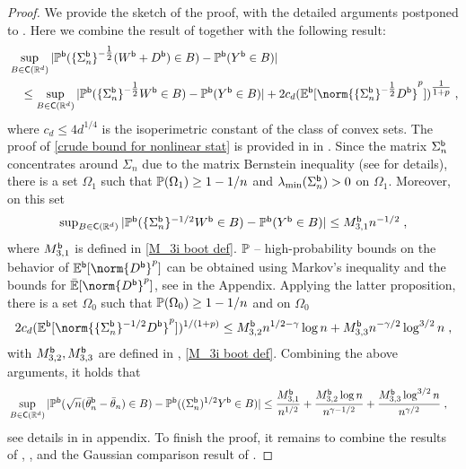\begin{proof} We provide the sketch of the proof, with the detailed arguments postponed to . Here we combine the result of  together with the following result: 
\begin{equation}
\label{crude bound for nonlinear stat}
\begin{split}
&\sup_{B \in \Conv(\rset^d)}|\PPb(\{\Sigma_n^\boot\}^{-\tfrac{1}{2}} (W^\boot + D^\boot) \in B) - \PPb(Y^\boot \in B)|  \\ 
&\quad \leq \sup_{B \in \Conv(\rset^d)}|\PPb(\{\Sigma_n^\boot\}^{-\tfrac{1}{2}} W^\boot \in B) - \PPb(Y^\boot \in B)| +  2 c_d (\PEb[\norm{\{\Sigma_n^\boot\}^{-\tfrac{1}{2}} D^\boot}^p])^{\tfrac{1}{1+p}}\eqsp, 
\end{split}
\end{equation}
where $c_d \le 4 d^{1/4}$ is the isoperimetric constant of the class of convex sets. The proof of \eqref{crude bound for nonlinear stat} is provided in  in . Since the matrix $\Sigma_n^{\mathsf{b}}$ concentrates around $\Sigma_n$ due to the matrix Bernstein inequality (see  for details), there is a set $\Omega_1$ such that $\mathbb{P}(\Omega_1) \geq 1-1/n$ and $\lambda_{\min}(\Sigma_n^{\mathsf{b}}) > 0$ on $\Omega_1$. Moreover, on this set 
\begin{equation}
\textstyle 
    \sup_{B \in \mathsf{C}(\mathbb{R}^d)}|\mathbb{P}^{\mathsf{b}}(\{\Sigma_n^{\mathsf{b}}\}^{-1/2} W^{\mathsf{b}} \in B) - \mathbb{P}^{\mathsf{b}}(Y^{\mathsf{b}} \in B)| \leq M_{3,1}^{\mathsf{b}} n^{-1/2}\;,
\end{equation}
where $M_{3,1}^{\mathsf{b}}$ is defined in \eqref{M_3i boot def}. $\mathbb{P}$ -- high-probability bounds on the behavior of $\PEb[\norm{D^\boot}^p]$ can be obtained using Markov's inequality and the bounds for $\bar{\PE}[\norm{D^\boot}^p]$, see  in the Appendix. Applying the latter proposition, there is a set $\Omega_0$ such that $\mathbb{P}(\Omega_0) \geq 1-1/n$ and on $\Omega_0$
\begin{equation}
    2 c_d (\PEb[\norm{\{\Sigma_n^\boot\}^{-1/2} D^\boot}^p])^{1/(1+p)} \leq M_{3,2}^\boot n^{1/2-\gamma} \log n  + M_{3,3}^\boot n^{-\gamma/2} \log^{3/2} n \eqsp,
\end{equation}
with $M_{3,2}^{\mathsf{b}}, M_{3,3}^{\mathsf{b}}$ are defined in , \eqref{M_3i boot def}. Combining the above arguments, it holds that 
\begin{equation}
\begin{split} 
    &\sup_{B \in \mathsf{C}(\mathbb{R}^d)}|\mathbb{P}^{\mathsf{b}}( \sqrt n   (\bar{\theta}_{n}^{\mathsf{b}} - \bar{\theta}_n) \in B) - \mathbb{P}^{\mathsf{b}}((\Sigma_n^{\mathsf{b}})^{1/2} Y^{\mathsf{b}} \in B)| \leq  \frac{M_{3,1}^{\mathsf{b}}}{n^{1/2}}  +  \frac{M_{3,2}^{\mathsf{b}}  \log n}{n^{\gamma-1/2}}  + \frac{M_{3,3}^{\mathsf{b}} \log^{3/2} n}{n^{\gamma/2}}\;,
    \end{split}
\end{equation}
see details in  in appendix. 
To finish the proof, it remains to combine the results of , , and the Gaussian comparison result of . 
\end{proof}

